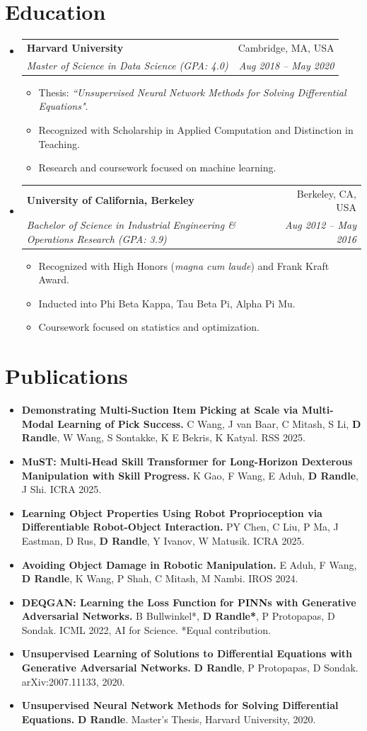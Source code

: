 \documentclass[a4paper,11pt]{article}
\makeatletter
\newcommand{\resumeItem}[1]{
  \item\small{#1}
}
\newcommand{\resumeItemListStart}{
  \begin{itemize}[rightmargin=0.11in, itemsep=2pt, topsep=4pt, parsep=0pt, partopsep=0pt]
}
\newcommand{\resumeItemListEnd}{\end{itemize}}
\newcommand{\resumeQuadHeading}[4]{
  \item
  \begin{tabular*}{0.96\textwidth}[t]{l@{\extracolsep{\fill}}r}
    \textbf{#1} & #2 \\
    \textit{\small#3} & \textit{\small #4} \\
  \end{tabular*}
}
\newcommand{\resumeHeadingListStart}{
  \begin{itemize}[leftmargin=0.15in, label={}]
}
\newcommand{\resumeHeadingListEnd}{\end{itemize}}
\makeatother
\begin{document}
\section{Education}
  \resumeHeadingListStart{}
    \resumeQuadHeading{Harvard University}{Cambridge, MA, USA}
    {Master of Science in Data Science (GPA: 4.0)}{Aug 2018 -- May 2020}
    \resumeItemListStart{}
        \resumeItem{Thesis: \textit{``Unsupervised Neural Network Methods for Solving Differential Equations"}.}
        \resumeItem{Recognized with Scholarship in Applied Computation and Distinction in Teaching.}
        \resumeItem{Research and coursework focused on machine learning.}
      
    \resumeItemListEnd{}
    \newpage
    \resumeQuadHeading{University of California, Berkeley}{Berkeley, CA, USA}
    {Bachelor of Science in Industrial Engineering \& Operations Research (GPA: 3.9)}{Aug 2012 -- May 2016}
    \resumeItemListStart{}
      \resumeItem{Recognized with High Honors (\textit{magna cum laude}) and Frank Kraft Award.}
      \resumeItem{Inducted into Phi Beta Kappa, Tau Beta Pi, Alpha Pi Mu.}
      \resumeItem{Coursework focused on statistics and optimization.}
    \resumeItemListEnd{}
  \resumeHeadingListEnd{}


\section{Publications}
    \resumeItemListStart{}
        \resumeItem{\textbf{Demonstrating Multi-Suction Item Picking at Scale via Multi-Modal Learning of Pick Success.} C Wang, J van Baar, C Mitash, S Li, \textbf{D Randle}, W Wang, S Sontakke, K E Bekris, K Katyal. RSS 2025.}
        \resumeItem{\textbf{MuST: Multi-Head Skill Transformer for Long-Horizon Dexterous Manipulation with Skill Progress.} K Gao, F Wang, E Aduh, \textbf{D Randle}, J Shi. ICRA 2025.}
        \resumeItem{\textbf{Learning Object Properties Using Robot Proprioception via Differentiable Robot-Object Interaction.} PY Chen, C Liu, P Ma, J Eastman, D Rus, \textbf{D Randle}, Y Ivanov, W Matusik. ICRA 2025.}
        \resumeItem{\textbf{Avoiding Object Damage in Robotic Manipulation.} E Aduh, F Wang, \textbf{D Randle}, K Wang, P Shah, C Mitash, M Nambi. IROS 2024.}
        \resumeItem{\textbf{DEQGAN: Learning the Loss Function for PINNs with Generative Adversarial Networks.} B Bullwinkel*, \textbf{D Randle*}, P Protopapas, D Sondak. ICML 2022, AI for Science. *Equal contribution.}
        \resumeItem{\textbf{Unsupervised Learning of Solutions to Differential Equations with Generative Adversarial Networks.} \textbf{D Randle}, P Protopapas, D Sondak. arXiv:2007.11133, 2020.}
        \resumeItem{\textbf{Unsupervised Neural Network Methods for Solving Differential Equations.} \textbf{D Randle}. Master's Thesis, Harvard University, 2020.}
    \resumeItemListEnd{}
\end{document}
